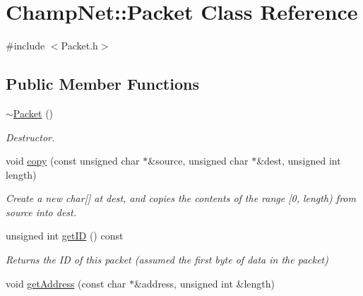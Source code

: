 \hypertarget{class_champ_net_1_1_packet}{\section{Champ\-Net\-:\-:Packet Class Reference}
\label{class_champ_net_1_1_packet}
}


{\ttfamily \#include $<$Packet.\-h$>$}

\subsection*{Public Member Functions}
\begin{DoxyCompactItemize}
\item 
\hypertarget{class_champ_net_1_1_packet_abc292b1324121a2d367aa7a44275eff5}{\hyperlink{class_champ_net_1_1_packet_abc292b1324121a2d367aa7a44275eff5}{$\sim$\-Packet} ()}\label{class_champ_net_1_1_packet_abc292b1324121a2d367aa7a44275eff5}

\begin{DoxyCompactList}\small\item\em Destructor. \end{DoxyCompactList}\item 
\hypertarget{class_champ_net_1_1_packet_a068e85d829e9fa4b980ec115b40048d3}{void \hyperlink{class_champ_net_1_1_packet_a068e85d829e9fa4b980ec115b40048d3}{copy} (const unsigned char $\ast$\&source, unsigned char $\ast$\&dest, unsigned int length)}\label{class_champ_net_1_1_packet_a068e85d829e9fa4b980ec115b40048d3}

\begin{DoxyCompactList}\small\item\em Create a new char\mbox{[}\mbox{]} at dest, and copies the contents of the range \mbox{[}0, length) from source into dest. \end{DoxyCompactList}\item 
\hypertarget{class_champ_net_1_1_packet_abe3a5de756c64e6890dcf4b0a95a2db7}{unsigned int \hyperlink{class_champ_net_1_1_packet_abe3a5de756c64e6890dcf4b0a95a2db7}{get\-I\-D} () const }\label{class_champ_net_1_1_packet_abe3a5de756c64e6890dcf4b0a95a2db7}

\begin{DoxyCompactList}\small\item\em Returns the I\-D of this packet (assumed the first byte of data in the packet) \end{DoxyCompactList}\item 
\hypertarget{class_champ_net_1_1_packet_a8ab4d17481d7fc08f3c0dc2c48eb9a0a}{void \hyperlink{class_champ_net_1_1_packet_a8ab4d17481d7fc08f3c0dc2c48eb9a0a}{get\-Address} (const char $\ast$\&address, unsigned int \&length)}\label{class_champ_net_1_1_packet_a8ab4d17481d7fc08f3c0dc2c48eb9a0a}


\end{DoxyCompactItemize}
